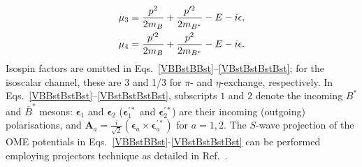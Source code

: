 \documentclass[aps,prl,showpacs,amsmath,twocolumn,superscriptaddress,floatfix,nofootinbib,notitlepage]{revtex4-2}
\newcommand{\veA}{{\bm A}}
\newcommand{\veep}{{\bm \epsilon}}
\begin{document}
\begin{appendix}
\begin{align}
\mu_3&=\frac{p^2}{2m_{B}}+
\frac{p^{\prime2}}{2m_{B^*}}-E-i\epsilon, \label{eq:alphaOME}
\\
\mu_4&=\frac{p^{\prime2}}{2m_{B}}+
\frac{p^2}{2m_{B^*}}-E-i\epsilon. \notag
\end{align}
Isospin factors are omitted in Eqs.~\eqref{VBBstBBst}--\eqref{VBstBstBstBst}; for the isoscalar channel, these are 3 and 1/3 for $\pi$- and $\eta$-exchange, respectively.
In Eqs.~\eqref{VBBstBstBst}--\eqref{VBstBstBstBst}, subscripts $1$ and $2$ denote the incoming $B^*$ and $\bar{B}^*$ mesons: $\veep_1$ and $\veep_2$ ($\veep_1^{\prime *}$ and $\veep_2^{\prime *}$) are their incoming (outgoing) polarisations, and $\veA_a=\frac{i}{\sqrt2}(\veep_a\times\veep_a^{\prime *})$ for $a=1,2$. 
The $S$-wave projection of the OME potentials in Eqs.~\eqref{VBBstBBst}-\eqref{VBstBstBstBst} can be performed employing projectors technique as detailed in Ref.~\cite{Zhang:2026iyr}.

\end{appendix}
\end{document}
